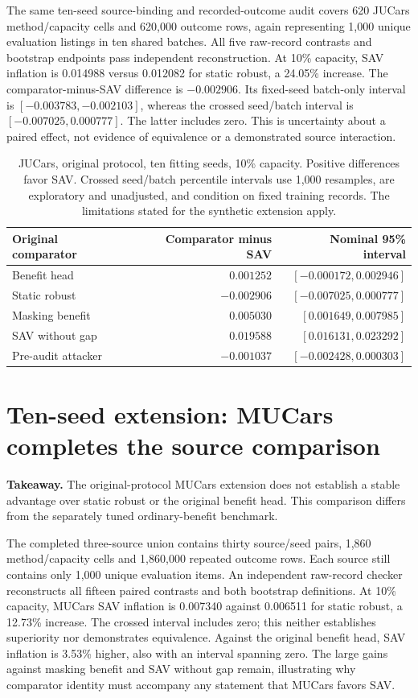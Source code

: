 \documentclass[11pt]{article}
\begin{document}
The same ten-seed source-binding and recorded-outcome audit covers 620 JUCars
method/capacity cells and 620,000 outcome rows, again representing 1,000 unique
evaluation listings in ten shared batches. All five raw-record contrasts and
bootstrap endpoints pass independent reconstruction. At 10\% capacity, SAV
inflation is 0.014988 versus 0.012082 for static robust, a 24.05\% increase.
The comparator-minus-SAV difference is $-0.002906$. Its fixed-seed batch-only
interval is $[-0.003783,-0.002103]$, whereas the crossed seed/batch interval is
$[-0.007025,0.000777]$. The latter includes zero. This is uncertainty about a
paired effect, not evidence of equivalence or a demonstrated source interaction.

\begin{table}[htbp]
\centering\small
\begin{tabular}{lrr}
\toprule
Original comparator & Comparator minus SAV & Nominal 95\% interval\\
\midrule
Benefit head & $0.001252$ & $[-0.000172,0.002946]$\\
Static robust & $-0.002906$ & $[-0.007025,0.000777]$\\
Masking benefit & $0.005030$ & $[0.001649,0.007985]$\\
SAV without gap & $0.019588$ & $[0.016131,0.023292]$\\
Pre-audit attacker & $-0.001037$ & $[-0.002428,0.000303]$\\
\bottomrule
\end{tabular}
\caption{JUCars, original protocol, ten fitting seeds, 10\% capacity.
Positive differences favor SAV. Crossed seed/batch percentile intervals use
1,000 resamples, are exploratory and unadjusted, and condition on fixed
training records. The limitations stated for the synthetic extension apply.}
\end{table}

\section{Ten-seed extension: MUCars completes the source comparison}
\noindent\textbf{Takeaway.} The original-protocol MUCars extension does not
establish a stable advantage over static robust or the original benefit head.
This comparison differs from the separately tuned ordinary-benefit benchmark.

The completed three-source union contains thirty source/seed pairs, 1,860
method/capacity cells and 1,860,000 repeated outcome rows. Each source still
contains only 1,000 unique evaluation items. An independent raw-record checker
reconstructs all fifteen paired contrasts and both bootstrap definitions.
At 10\% capacity, MUCars SAV inflation is 0.007340 against 0.006511 for static
robust, a 12.73\% increase. The crossed interval includes zero; this neither
establishes superiority nor demonstrates equivalence. Against the original
benefit head, SAV inflation is 3.53\% higher, also with an interval spanning zero.
The large gains against masking benefit and SAV without gap remain, illustrating
why comparator identity must accompany any statement that MUCars favors SAV.
\end{document}
